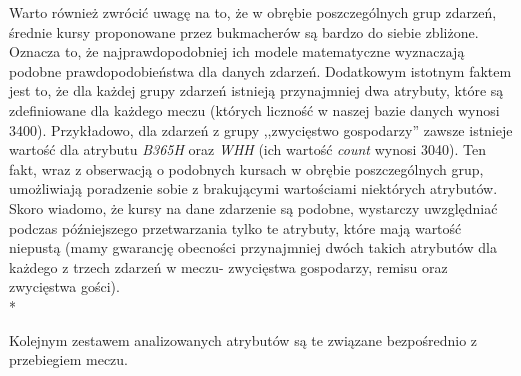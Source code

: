     Warto również zwrócić uwagę na to, że w obrębie poszczególnych grup zdarzeń, średnie kursy proponowane przez bukmacherów są bardzo do siebie zbliżone. Oznacza to, że najprawdopodobniej ich modele matematyczne wyznaczają podobne prawdopodobieństwa dla danych zdarzeń. Dodatkowym istotnym faktem jest to, że dla każdej grupy zdarzeń istnieją przynajmniej dwa atrybuty, które są zdefiniowane dla każdego meczu (których liczność w naszej bazie danych wynosi 3400). Przykładowo, dla zdarzeń z grupy ,,zwycięstwo gospodarzy'' zawsze istnieje wartość dla atrybutu \emph{B365H} oraz \emph{WHH} (ich wartość \emph{count} wynosi 3040). Ten fakt, wraz z obserwacją o podobnych kursach w obrębie poszczególnych grup, umożliwiają poradzenie sobie z brakującymi wartościami niektórych atrybutów. Skoro wiadomo, że kursy na dane zdarzenie są podobne, wystarczy uwzględniać podczas późniejszego przetwarzania tylko te atrybuty, które mają wartość niepustą (mamy gwarancję obecności przynajmniej dwóch takich atrybutów dla każdego z trzech zdarzeń w meczu- zwycięstwa gospodarzy, remisu oraz zwycięstwa gości). \\*
    
    \noindent Kolejnym zestawem analizowanych atrybutów są te związane bezpośrednio z przebiegiem meczu. 
    
